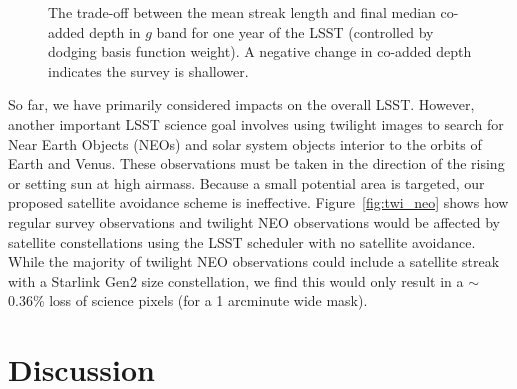 \documentclass[twocolumn]{aastex631}
\begin{document}
\begin{figure}[ht!]
\caption{The trade-off between the mean streak length and final median co-added depth in $g$ band for one year of the LSST (controlled by dodging basis function weight). A negative change in co-added depth indicates the survey is shallower. 
\label{fig-trade-off}}
\end{figure}

So far, we have primarily considered impacts on the overall LSST. However, another important LSST science goal involves using twilight images to search for Near Earth Objects (NEOs) and solar system objects interior to the orbits of Earth and Venus. These observations must be taken in the direction of the rising or setting sun at high airmass. Because a small potential area is targeted, our proposed satellite avoidance scheme is ineffective. Figure~\ref{fig:twi_neo} shows how regular survey observations and twilight NEO observations would be affected by satellite constellations using the LSST scheduler with no satellite avoidance.  While the majority of twilight NEO observations could include a satellite streak with a Starlink Gen2 size constellation, we find this would only result in a $\sim$0.36\% loss of science pixels (for a 1 arcminute wide mask).

\begin{figure*}
\centering
{}
\caption{Impacts of satellite streaks on simulated LSST observations without any satellite avoidance. Compared to standard LSST observations (top), twilight NEO observations (bottom) cannot easily be shifted to avoid satellites. The left panels show the altitude and azimuth distribution of observations on the sky (zenith at the center of the plots), and the right panels show how many streaks would result from the three simulated satellite constellations as a function of how high above the horizon the telescope is pointing (observation altitude). Note that  most twilight NEO observations would contain a satellite streak.
\label{fig:twi_neo}}
\end{figure*}


\section{Discussion}\label{discuss}
\end{document}
